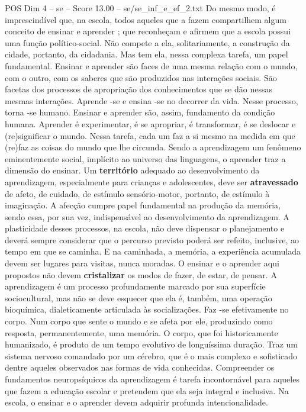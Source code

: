 \begin{textsample}{POS Dim 4 – se – Score 13.00 – se/se\_inf\_e\_ef\_2.txt}
Do mesmo modo, é imprescindível que, na escola, todos aqueles que a fazem compartilhem algum conceito de ensinar e aprender ; que reconheçam e afirmem que a escola possui uma função político-social.
Não compete a ela, solitariamente, a construção da cidade, portanto, da cidadania.
Mas tem ela, nessa complexa tarefa, um papel fundamental.
Ensinar e aprender são faces de uma mesma relação com o mundo, com o outro, com os saberes que são produzidos nas interações sociais.
São facetas dos processos de apropriação dos conhecimentos que se dão nessas mesmas interações.
Aprende -se e ensina -se no decorrer da vida.
Nesse processo, torna -se humano.
Ensinar e aprender são, assim, fundamento da condição humana.
Aprender é experimentar, é se apropriar, é transformar, é se deslocar e (re)significar o mundo.
Nessa tarefa, cada um faz a si mesmo na medida em que (re)faz as coisas do mundo que lhe circunda.
Sendo a aprendizagem um fenômeno eminentemente social, implícito ao universo das linguagens, o aprender traz a dimensão do ensinar.
Um \textbf{território} adequado ao desenvolvimento da aprendizagem, especialmente para crianças e adolescentes, deve ser \textbf{atravessado} de afeto, de cuidado, de estímulo sensório-motor, portanto, de estímulo à imaginação.
A afecção cumpre papel fundamental na produção da memória, sendo essa, por sua vez, indispensável ao desenvolvimento da aprendizagem.
A plasticidade desses processos, na escola, não deve dispensar o planejamento e deverá sempre considerar que o percurso previsto poderá ser refeito, inclusive, ao tempo em que se caminha.
E na caminhada, a memória, a experiência acumulada devem ser lugares para visitas, nunca moradas.
O ensinar e o aprender aqui propostos não devem \textbf{cristalizar} os modos de fazer, de estar, de pensar.
A aprendizagem é um processo profundamente marcado por sua superfície sociocultural, mas não se deve esquecer que ela é, também, uma operação bioquímica, dialeticamente articulada às socializações.
Faz -se efetivamente no corpo.
Num corpo que sente o mundo e se afeta por ele, produzindo como resposta, permanentemente, uma memória.
O corpo, que foi historicamente humanizado, é produto de um tempo evolutivo de longuíssima duração.
Traz um sistema nervoso comandado por um cérebro, que é o mais complexo e sofisticado dentre aqueles observados nas formas de vida conhecidas.
Compreender os fundamentos neuropsíquicos da aprendizagem é tarefa incontornável para aqueles que fazem a educação escolar e pretendem que ela seja integral e inclusiva.
Na escola, o ensinar e o aprender devem adquirir profunda intencionalidade.

\end{textsample}
